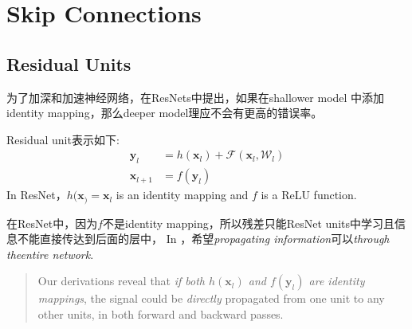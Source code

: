 \chapter{Skip Connections}

\section{Residual Units}
为了加深和加速神经网络，在ResNets\cite{He2016resnet}中提出，如果在shallower model
中添加identity mapping，那么deeper model理应不会有更高的错误率。
\par
Residual unit表示如下:
\begin{equation}
    \begin{split}
        \mathbf{y}_l &= h(\mathbf{x}_l) + \mathcal{F}(\mathbf{x}_l, \mathcal{W}_l) \\
        \mathbf{x}_{l+1} &= f(\mathbf{y}_l)
    \end{split}
\end{equation}
In ResNet，$h(\mathbf{x}_) = \mathbf{x}_l$ is an identity mapping and $f$ is a ReLU function.
\par
在ResNet中，因为$f$不是identity mapping，所以残差只能ResNet units中学习且信息不能直接传达到后面的层中，
In \cite{He2016identity}，希望\textit{propagating information}可以\textit{through theentire network}.
\begin{quotation}
    Our derivations reveal that \textit{if both $h(\mathbf{x}_l)$ and
$f(\mathbf{y}_l)$ are identity mappings}, the signal could be \textit{directly} 
propagated from one unit to any other units, in both forward and backward passes.\cite{He2016identity}
\end{quotation}

